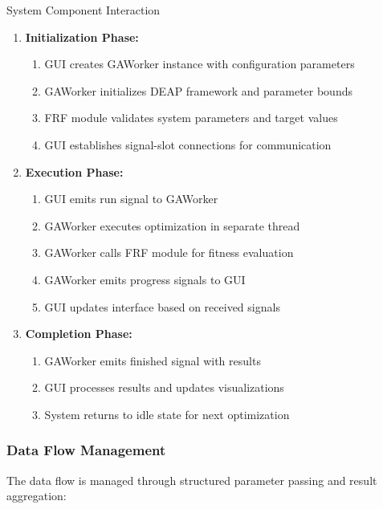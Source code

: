 \documentclass[12pt,a4paper]{article}
\begin{document}
\begin{algorithm}
\caption{System Component Interaction}
\begin{enumerate}
    \item \textbf{Initialization Phase:}
    \begin{enumerate}
        \item GUI creates GAWorker instance with configuration parameters
        \item GAWorker initializes DEAP framework and parameter bounds
        \item FRF module validates system parameters and target values
        \item GUI establishes signal-slot connections for communication
    \end{enumerate}
    \item \textbf{Execution Phase:}
    \begin{enumerate}
        \item GUI emits run signal to GAWorker
        \item GAWorker executes optimization in separate thread
        \item GAWorker calls FRF module for fitness evaluation
        \item GAWorker emits progress signals to GUI
        \item GUI updates interface based on received signals
    \end{enumerate}
    \item \textbf{Completion Phase:}
    \begin{enumerate}
        \item GAWorker emits finished signal with results
        \item GUI processes results and updates visualizations
        \item System returns to idle state for next optimization
    \end{enumerate}
\end{enumerate}
\end{algorithm}

\subsubsection{Data Flow Management}

The data flow is managed through structured parameter passing and result aggregation:
\end{document}
